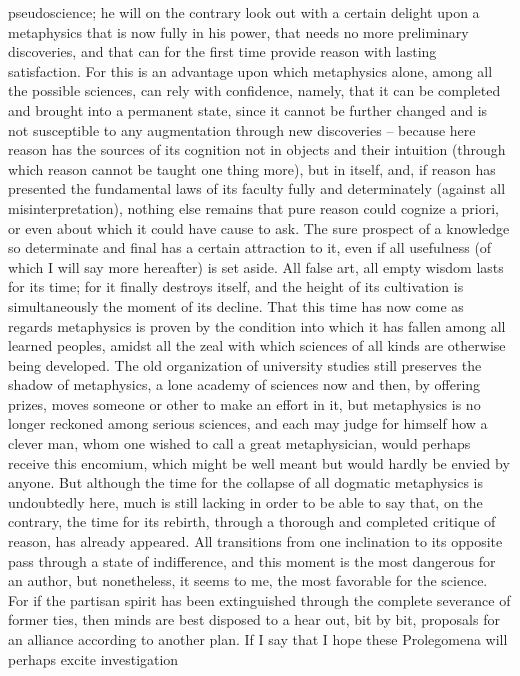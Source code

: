 pseudoscience; he will on the contrary look out with a certain delight
upon a metaphysics that is now fully in his power, that needs no more
preliminary discoveries, and that can for the ﬁrst time provide reason
with lasting satisfaction. For this is an advantage upon which metaphysics
alone, among all the possible sciences, can rely with conﬁdence, namely,
that it can be completed and brought into a permanent state, since it
cannot be further changed and is not susceptible to any augmentation
through new discoveries – because here reason has the sources of its
cognition not in objects and their intuition (through which reason cannot
be taught one thing more), but in itself, and, if reason has presented
the fundamental laws of its faculty fully and determinately (against all
misinterpretation), nothing else remains that pure reason could cognize
a priori, or even about which it could have cause to ask. The sure prospect
of a knowledge so determinate and ﬁnal has a certain attraction to it, even
if all usefulness (of which I will say more hereafter) is set aside.
All false art, all empty wisdom lasts for its time; for it ﬁnally destroys
itself, and the height of its cultivation is simultaneously the moment of its
decline. That this time has now come as regards metaphysics is proven by
the condition into which it has fallen among all learned peoples, amidst
all the zeal with which sciences of all kinds are otherwise being developed.
The old organization of university studies still preserves the shadow of
metaphysics, a lone academy of sciences now and then, by offering prizes,
moves someone or other to make an effort in it, but metaphysics is no
longer reckoned among serious sciences, and each may judge for himself
how a clever man, whom one wished to call a great metaphysician, would
perhaps receive this encomium, which might be well meant but would
hardly be envied by anyone.
But although the time for the collapse of all dogmatic metaphysics
is undoubtedly here, much is still lacking in order to be able to say
that, on the contrary, the time for its rebirth, through a thorough and
completed critique of reason, has already appeared. All transitions from
one inclination to its opposite pass through a state of indifference, and
this moment is the most dangerous for an author, but nonetheless, it
seems to me, the most favorable for the science. For if the partisan spirit
has been extinguished through the complete severance of former ties,
then minds are best disposed to a hear out, bit by bit, proposals for an
alliance according to another plan.
If I say that I hope these Prolegomena will perhaps excite investigation
